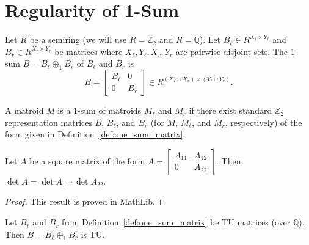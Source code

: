 \chapter{Regularity of 1-Sum}

\begin{definition}
    \label{def:one_sum_matrix}
    \leanok
    Let $R$ be a semiring (we will use $R = \mathbb{Z}_{2}$ and $R = \mathbb{Q}$). Let $B_{\ell} \in R^{X_{\ell} \times Y_{\ell}}$ and $B_{r} \in R^{X_{r} \times Y_{r}}$ be matrices where $X_{\ell}, Y_{\ell}, X_{r}, Y_{r}$ are pairwise disjoint sets. The $1$-sum $B = B_{\ell} \oplus_{1} B_{r}$ of $B_{\ell}$ and $B_{r}$ is
    \[
        B = \begin{bmatrix} B_{\ell} & 0 \\ 0 & B_{r} \end{bmatrix} \in R^{(X_{\ell} \cup X_{r}) \times (Y_{\ell} \cup Y_{r})}.
    \]
\end{definition}

\begin{definition}
    \label{def:one_sum_matroid}
    \leanok
    A matroid $M$ is a $1$-sum of matroids $M_{\ell}$ and $M_{r}$ if there exist standard $\mathbb{Z}_{2}$ representation matrices $B$, $B_{\ell}$, and $B_{r}$ (for $M$, $M_{\ell}$, and $M_{r}$, respectively) of the form given in Definition~\ref{def:one_sum_matrix}.
\end{definition}

\begin{lemma}
    \label{lem:det_lower_left_zero}
    \leanok
    Let $A$ be a square matrix of the form $A = \begin{bmatrix} A_{11} & A_{12} \\ 0 & A_{22} \end{bmatrix}$. Then $\det A = \det A_{11} \cdot \det A_{22}$.
\end{lemma}

\begin{proof}
    \leanok
    This result is proved in MathLib.
\end{proof}

\begin{lemma}
    \label{lem:one_sum_tu}
    \leanok
    Let $B_{\ell}$ and $B_{r}$ from Definition~\ref{def:one_sum_matrix} be TU matrices (over $\mathbb{Q}$). Then $B = B_{\ell} \oplus_{1} B_{r}$ is TU.
\end{lemma}

